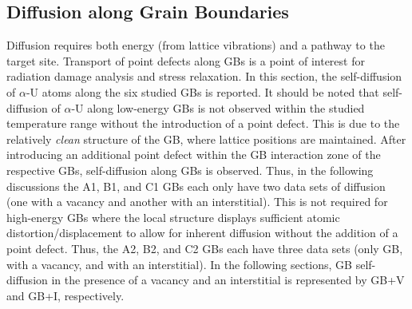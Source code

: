 \documentclass[review]{elsarticle}
\begin{document}



\FloatBarrier

\subsection{Diffusion along Grain Boundaries}
Diffusion requires both energy (from lattice vibrations) and a pathway to the target site. Transport of point defects along GBs is a point of interest for radiation damage analysis and stress relaxation. In this section, the self-diffusion of $\alpha$-U atoms along the six studied GBs is reported. It should be noted that self-diffusion of $\alpha$-U along low-energy GBs is not observed within the studied temperature range without the introduction of a point defect. This is due to the relatively \textit{clean} structure of the GB, where lattice positions are maintained. After introducing an additional point defect within the GB interaction zone of the respective GBs, self-diffusion along GBs is observed. Thus, in the following discussions the A1, B1, and C1 GBs each only have two data sets of diffusion (one with a vacancy and another with an interstitial). This is not required for high-energy GBs where the local structure displays sufficient atomic distortion/displacement to allow for inherent diffusion without the addition of a point defect. Thus, the A2, B2, and C2 GBs each have three data sets (only GB, with a vacancy, and with an interstitial). In the following sections, GB self-diffusion in the presence of a vacancy and an interstitial is represented by GB+V and GB+I, respectively. 
\end{document}

